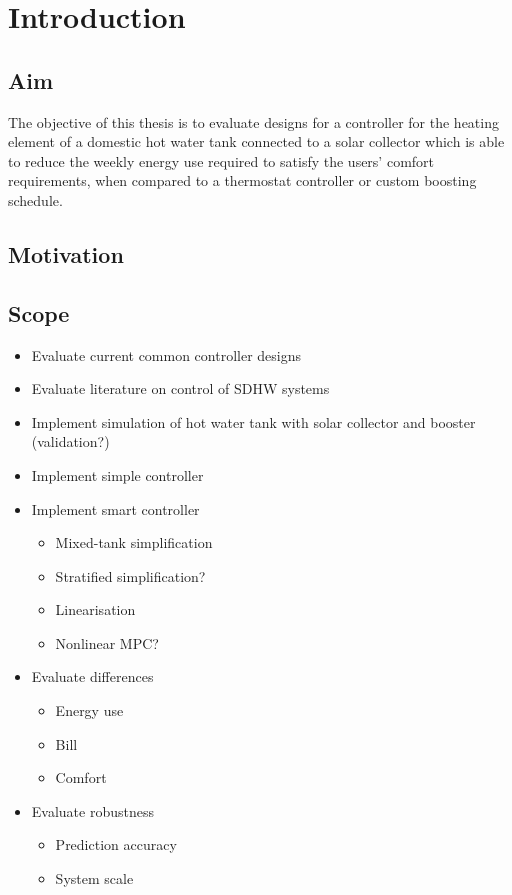 \chapter{Introduction}

\section{Aim}

The objective of this thesis is to evaluate designs for a controller for the heating element of a domestic hot water tank connected to a solar collector which is able to reduce the weekly energy use required to satisfy the users' comfort requirements, when compared to a thermostat controller or custom boosting schedule.


\section{Motivation}

\section{Scope}

\begin{itemize}
	\item Evaluate current common controller designs
	\item Evaluate literature on control of SDHW systems
	\item Implement simulation of hot water tank with solar collector and booster (validation?)
	\item Implement simple controller
	\item Implement smart controller
	\begin{itemize}
		\item Mixed-tank simplification
		\item Stratified simplification?
		\item Linearisation
		\item Nonlinear MPC?
	\end{itemize}
	\item Evaluate differences
	\begin{itemize}
		\item Energy use
		\item Bill
		\item Comfort
	\end{itemize}
	\item Evaluate robustness
	\begin{itemize}
		\item Prediction accuracy
		\item System scale
	\end{itemize}
\end{itemize}

